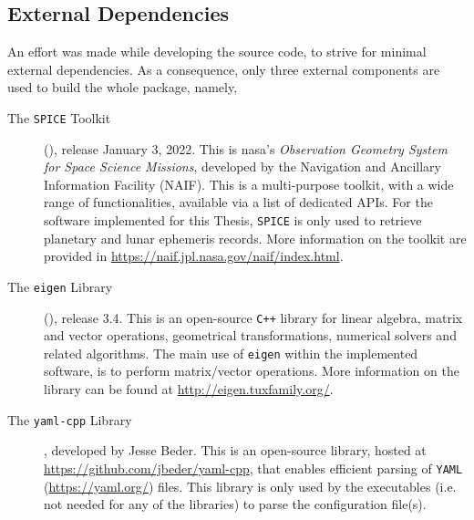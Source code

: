 \subsection{External Dependencies}\label{sec:the-software-dependencies}
An effort was made while developing the source code, to strive for minimal external 
dependencies. As a consequence, only three external components are used to build 
the whole package, namely,
\begin{description}
  \item[The \texttt{SPICE} Toolkit] (\cite{Acton2018}), release January 3, 2022. 
  This is \gls{nasa}'s 
  \emph{Observation Geometry System for Space Science Missions}, developed by the 
  Navigation and Ancillary Information Facility (NAIF). This is a multi-purpose 
  toolkit, with a wide range of functionalities, available via a list of dedicated 
  APIs. For the software implemented for this Thesis, \texttt{SPICE} is only used to 
  retrieve planetary and lunar ephemeris records. More information on the 
  toolkit are provided in \url{https://naif.jpl.nasa.gov/naif/index.html}.

  \item[The \texttt{eigen} Library] (\cite{eigenweb}), release 3.4. This is an 
  open-source \texttt{C++} library for linear algebra, matrix and vector 
  operations, geometrical transformations, numerical solvers and related algorithms.
  The main use of \texttt{eigen} within the implemented software, is to perform 
  matrix/vector operations. More information on the library can be found at 
  \url{http://eigen.tuxfamily.org/}.

  \item[The \texttt{yaml-cpp} Library], developed by Jesse Beder. This is an open-source 
  library, hosted at \url{https://github.com/jbeder/yaml-cpp}, that enables efficient 
  parsing of \texttt{YAML} (\url{https://yaml.org/}) files. This library is only 
  used by the executables (i.e. not needed for any of the libraries) to parse the 
  configuration file(s).
\end{description}
